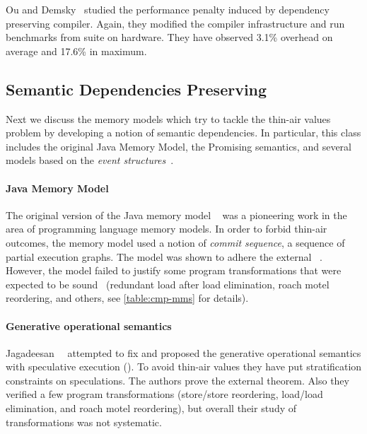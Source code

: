 Ou and Demsky~\cite{Ou-Demsky:OOPSLA18} studied 
the performance penalty induced by dependency preserving compiler. 
Again, they modified the \LLVM compiler infrastructure 
and run benchmarks from \SPECCPU suite on  hardware. 
They have observed 3.1\% overhead on average and 17.6\% in maximum. 

\subsection{Semantic Dependencies Preserving}
\label{sec:catalog:sdeprf}

Next we discuss the memory models 
which try to tackle the thin-air values problem 
by developing a notion of semantic dependencies. 
In particular, this class includes the original Java Memory Model, 
the Promising semantics, and several models based 
on the \emph{event structures}~\cite{Winskel:86}.

\paragraph{Java Memory Model}
\label{sec:catalog:jmm}

The original version of the Java memory model \JMM~\cite{Manson-al:POPL05}
was a pioneering work in the area of programming language memory models. 
In order to forbid thin-air outcomes, the memory model used 
a notion of \emph{commit sequence}, \ie a sequence of partial execution graphs.
The model was shown to adhere the external \DRF~\cite{Huisman-Petri:CONCUR07}.
However, the model failed to justify some program transformations 
that were expected to be sound~\cite{Sevcik-Aspinall:ECOOP08} 
(\eg redundant load after load elimination, roach motel reordering, and others,
see \cref{table:cmp-mms} for details). 

\paragraph{Generative operational semantics}

Jagadeesan~\etal~\cite{Jagadeesan-al:ESOP10} attempted to fix \JMM 
and proposed the generative operational semantics 
with speculative execution (\GOS).
To avoid thin-air values they have put stratification constraints 
on speculations. The authors prove the external \DRF theorem. 
Also they verified a few program transformations 
(store/store reordering, load/load elimination, and roach motel reordering), 
but overall their study of transformations was not systematic.  

